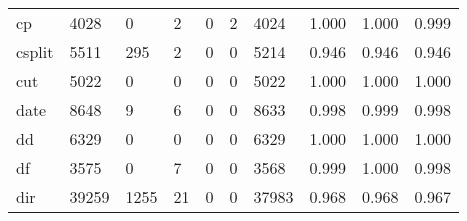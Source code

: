\begin{longtable}{lp{2.0cm}p{2.0cm}p{2.0cm}p{2.0cm}p{2.0cm}p{2.0cm}p{2.0cm}p{2.0cm}p{2.0cm}}
cp        &                   4028 &                                  0 &                                 2 &                                0 &                                 2 &                            4024 &                                   1.000 &                                  1.000 &                                0.999 \\
csplit    &                   5511 &                                295 &                                 2 &                                0 &                                 0 &                            5214 &                                   0.946 &                                  0.946 &                                0.946 \\
cut       &                   5022 &                                  0 &                                 0 &                                0 &                                 0 &                            5022 &                                   1.000 &                                  1.000 &                                1.000 \\
date      &                   8648 &                                  9 &                                 6 &                                0 &                                 0 &                            8633 &                                   0.998 &                                  0.999 &                                0.998 \\
dd        &                   6329 &                                  0 &                                 0 &                                0 &                                 0 &                            6329 &                                   1.000 &                                  1.000 &                                1.000 \\
df        &                   3575 &                                  0 &                                 7 &                                0 &                                 0 &                            3568 &                                   0.999 &                                  1.000 &                                0.998 \\
dir       &                  39259 &                               1255 &                                21 &                                0 &                                 0 &                           37983 &                                   0.968 &                                  0.968 &                                0.967 \\

\end{longtable}

